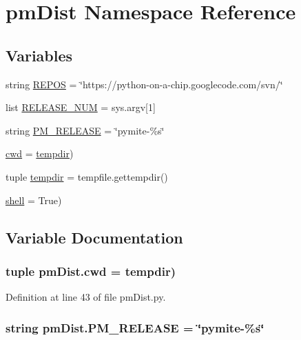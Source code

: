 \hypertarget{namespacepm_dist}{\section{pm\-Dist Namespace Reference}
\label{namespacepm_dist}
}
\subsection*{Variables}
\begin{DoxyCompactItemize}
\item 
string \hyperlink{namespacepm_dist_ad99dbda76477db06e3ed433e84315280}{R\-E\-P\-O\-S} = \char`\"{}https\-://python-\/on-\/a-\/chip.\-googlecode.\-com/svn/\char`\"{}
\item 
list \hyperlink{namespacepm_dist_aa5371bd34791a27a514bb0cce333d5c0}{R\-E\-L\-E\-A\-S\-E\-\_\-\-N\-U\-M} = sys.\-argv\mbox{[}1\mbox{]}
\item 
string \hyperlink{namespacepm_dist_ad391815b4264aaef9ba4b8c3680066a0}{P\-M\-\_\-\-R\-E\-L\-E\-A\-S\-E} = \char`\"{}pymite-\/\%s\char`\"{}
\item 
\hyperlink{namespacepm_dist_a0134c098ed9d664fa8fe4f8ecc5259d1}{cwd} = \hyperlink{namespacepm_dist_aefe127821e8caea0634b43a66eca04e6}{tempdir})
\item 
tuple \hyperlink{namespacepm_dist_aefe127821e8caea0634b43a66eca04e6}{tempdir} = tempfile.\-gettempdir()
\item 
\hyperlink{namespacepm_dist_abf2580adf6ba60a74862e3f4f093a05e}{shell} = True)
\end{DoxyCompactItemize}


\subsection{Variable Documentation}
\hypertarget{namespacepm_dist_a0134c098ed9d664fa8fe4f8ecc5259d1}{
\subsubsection[{cwd}]{\setlength{\rightskip}{0pt plus 5cm}tuple pm\-Dist.\-cwd = {\bf tempdir})}}\label{namespacepm_dist_a0134c098ed9d664fa8fe4f8ecc5259d1}


Definition at line 43 of file pm\-Dist.\-py.

\hypertarget{namespacepm_dist_ad391815b4264aaef9ba4b8c3680066a0}{
\subsubsection[{P\-M\-\_\-\-R\-E\-L\-E\-A\-S\-E}]{\setlength{\rightskip}{0pt plus 5cm}string pm\-Dist.\-P\-M\-\_\-\-R\-E\-L\-E\-A\-S\-E = \char`\"{}pymite-\/\%s\char`\"{}}}\label{namespacepm_dist_ad391815b4264aaef9ba4b8c3680066a0}


